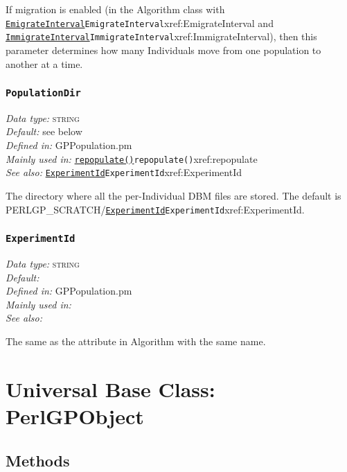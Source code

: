\documentclass[a4paper]{article}
\begin{document}
If migration is enabled (in the Algorithm class with
\hyperref[no]{\texttt{EmigrateInterval}}{\texttt{EmigrateInterval}}{xref:EmigrateInterval} and \hyperref[no]{\texttt{ImmigrateInterval}}{\texttt{ImmigrateInterval}}{xref:ImmigrateInterval}), then this
parameter determines how many Individuals move from one population to
another at a time.

\subsubsection{\texttt{PopulationDir}}\label{xref:PopulationDir}
\begin{flushleft}
\textit{Data type:} \textsc{string}\\
\textit{Default:} see below\\
\textit{Defined in:} GPPopulation.pm\\
\textit{Mainly used in:} \hyperref[no]{\texttt{repopulate()}}{\texttt{repopulate()}}{xref:repopulate}\\
\textit{See also:} \hyperref[no]{\texttt{ExperimentId}}{\texttt{ExperimentId}}{xref:ExperimentId}
\end{flushleft}

The directory where all the per-Individual DBM files are stored.
The default is PERLGP\_SCRATCH/\hyperref[no]{\texttt{ExperimentId}}{\texttt{ExperimentId}}{xref:ExperimentId}.


\subsubsection{\texttt{ExperimentId}}\label{Individual::ExperimentId}
\begin{flushleft}
\textit{Data type:} \textsc{string}\\
\textit{Default:} \\
\textit{Defined in:} GPPopulation.pm\\
\textit{Mainly used in:} \texttt{}\\
\textit{See also:} \texttt{}
\end{flushleft}

The same as the attribute in Algorithm with the same name.

\section{Universal Base Class: PerlGPObject}\label{PerlGPObject}

\subsection{Methods}
\end{document}
